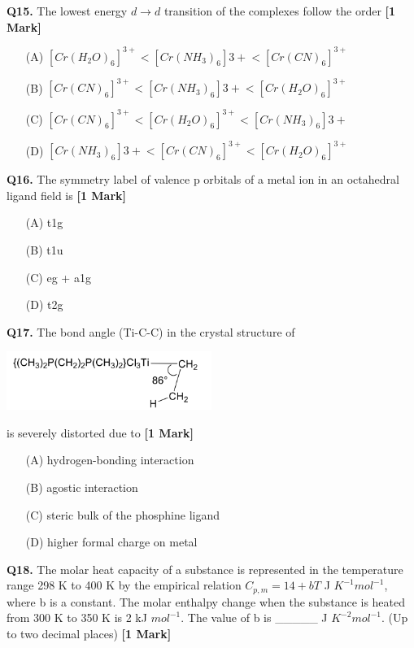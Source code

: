 \documentclass[11pt]{article}
\newcommand{\questiona}[2]{
    \noindent\textbf{Q#2.} #1 \hfill \textbf{[1 Mark]}
}
\begin{document}
\questiona{The lowest energy \( d \rightarrow d \) transition of the complexes follow the order}{15}
\begin{enumerate}
    \item[(A)] $[Cr(H_2O)_6]^{3+} < [Cr(NH_3)_6]{3+} < [Cr(CN)_6]^{3+}$
    \item[(B)] $[Cr(CN)_6]^{3+}< [Cr(NH_3)_6]{3+} < [Cr(H_2O)_6]^{3+}$
    \item[(C)] $[Cr(CN)_6]^{3+}< [Cr(H_2O)_6]^{3+} < [Cr(NH_3)_6]{3+}$
    \item[(D)] $[Cr(NH_3)_6]{3+} < [Cr(CN)_6]^{3+} < [Cr(H_2O)_6]^{3+}$
\end{enumerate}
\vspace{0.5cm}

\questiona{The symmetry label of valence p orbitals of a metal ion in an octahedral ligand field is}{16}
\begin{enumerate}
    \item[(A)] t1g
    \item[(B)] t1u
    \item[(C)] eg + a1g
    \item[(D)] t2g
\end{enumerate}
\vspace{0.5cm}

\questiona{The bond angle (Ti-C-C) in the crystal structure of 
\begin{center}
\includegraphics[width=0.5\textwidth]{figures/17.png}
\end{center}
is severely distorted due to}{17}
\begin{enumerate}
    \item[(A)] hydrogen-bonding interaction
    \item[(B)] agostic interaction
    \item[(C)] steric bulk of the phosphine ligand
    \item[(D)] higher formal charge on metal
\end{enumerate}
\vspace{0.5cm}

\questiona{The molar heat capacity of a substance is represented in the temperature range 298 K to 400 K by the empirical relation \( C_{p,m} = 14 + bT \) J $K^{-1} mol^{-1}$, where b is a constant. The molar enthalpy change when the substance is heated from 300 K to 350 K is 2 kJ $mol^{-1}$. The value of b is \_\_\_\_\_ J $K^{-2} mol^{-1}$. (Up to two decimal places)}{18}
\vspace{0.5cm}
\end{document}
